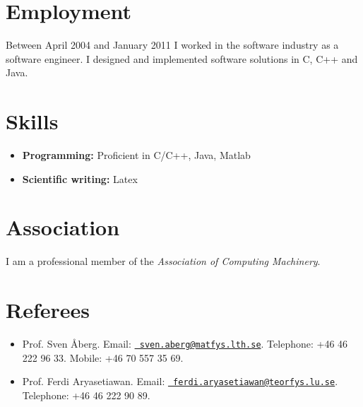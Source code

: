 \documentclass[10pt,letterpaper]{article}
\begin{document}
\section*{Employment}
Between April 2004 and January 2011 I worked in the software industry
as a software engineer. I designed and implemented software solutions
in C, C++ and Java.

\section*{Skills}
\begin{itemize}
\item {\bf Programming:} Proficient in C/C++, Java, Matlab
\item {\bf Scientific writing:} Latex
\end{itemize}

\section*{Association}
I am a professional member of the {\it Association of Computing Machinery}.

\section*{Referees}
\begin{itemize}
\item Prof. Sven \AA berg. Email:
  \href{mailto:sven.aberg@matfys.lth.se}{\tt
    sven.aberg@matfys.lth.se}. Telephone: +46 46 222 96 33. Mobile:
  +46 70 557 35 69.

\item Prof. Ferdi
  Aryasetiawan. Email: \href{ferdi.aryasetiawan@teorfys.lu.se}{\tt
    ferdi.aryasetiawan@teorfys.lu.se}. Telephone: +46 46 222 90 89.
\end{itemize}
\end{document}

